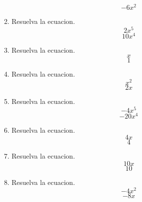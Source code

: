 \documentclass[12pt]{article}%
\begin{document}
\begin{enumerate}[wide, labelwidth=!, labelindent=0pt,label={Pregunta \arabic*. }]
\begin{equation*}- 6 x^{2}\end{equation*}%
\item%
%
Resuelva la ecuacion.%
\begin{equation*}2 x^{5}\end{equation*}%
\begin{equation*}10 x^{4}\end{equation*}%
\item%
%
Resuelva la ecuacion.%
\begin{equation*}x\end{equation*}%
\begin{equation*}1\end{equation*}%
\item%
%
Resuelva la ecuacion.%
\begin{equation*}x^{2}\end{equation*}%
\begin{equation*}2 x\end{equation*}%
\item%
%
Resuelva la ecuacion.%
\begin{equation*}- 4 x^{5}\end{equation*}%
\begin{equation*}- 20 x^{4}\end{equation*}%
\item%
%
Resuelva la ecuacion.%
\begin{equation*}4 x\end{equation*}%
\begin{equation*}4\end{equation*}%
\item%
%
Resuelva la ecuacion.%
\begin{equation*}10 x\end{equation*}%
\begin{equation*}10\end{equation*}%
\item%
%
Resuelva la ecuacion.%
\begin{equation*}- 4 x^{2}\end{equation*}%
\begin{equation*}- 8 x\end{equation*}%
\end{enumerate}%
\end{document}
